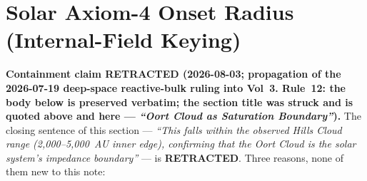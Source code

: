 \section{Solar Axiom-4 Onset Radius (Internal-Field Keying)}
\label{sec:oort_cloud}

\noindent\textbf{Containment claim RETRACTED (2026-08-03; propagation of the
2026-07-19 deep-space reactive-bulk ruling into Vol~3. Rule~12: the body below
is preserved verbatim; the section title was struck and is quoted above and
here --- \emph{``Oort Cloud as Saturation Boundary''}).}  The closing sentence
of this section --- \emph{``This falls within the observed Hills Cloud range
(2,000--5,000~AU inner edge), confirming that the Oort Cloud is the solar
system's impedance boundary''} --- is \textbf{RETRACTED}.  Three reasons, none
of them new to this note:

